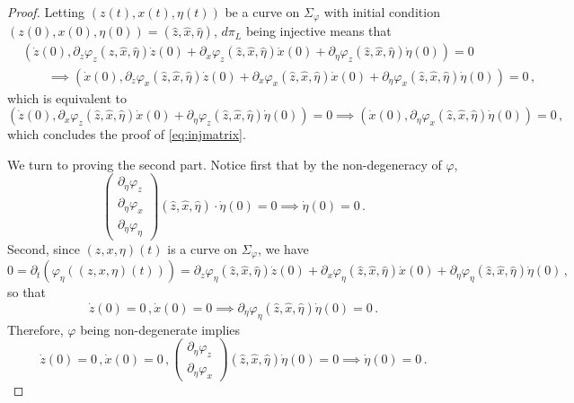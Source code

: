 \documentclass[10pt,a4paper]{amsart}
\newcommand{\del}{\partial}
\begin{document}
\begin{proof}
	Letting $(z(t), x(t),\eta(t))$ be a curve on $\Sigma_\varphi$ with initial condition $(z(0),x(0),\eta(0)) = (\hat z, \hat x, \hat \eta)$, $d\pi_L$ being injective means that
	\begin{align*}
		&{}(\dot z(0), \del_z\varphi_{z}(\hat z, \hat x, \hat \eta)\dot z(0)+ \del_x\varphi_{z}(\hat z, \hat x, \hat \eta)\dot x(0) +  \del_\eta\varphi_{z}(\hat z, \hat x, \hat \eta)\dot\eta(0)) = 0 \\
		&\qquad\implies (\dot x(0), \del_z\varphi_{x}(\hat z, \hat x, \hat \eta)\dot z(0)+ \del_x\varphi_{x}(\hat z, \hat x, \hat \eta)\dot x(0) +  \del_\eta\varphi_{x}(\hat z, \hat x, \hat \eta)\dot\eta(0)) = 0\,,
	\end{align*}
	which is equivalent to 
	\[
(\dot z(0), \del_x\varphi_{z}(\hat z, \hat x, \hat \eta)\dot x(0) +  \del_\eta\varphi_{z}(\hat z, \hat x, \hat \eta)\dot\eta(0)) = 0 \implies (\dot x(0), \del_\eta\varphi_{x}(\hat z, \hat x, \hat \eta)\dot\eta(0)) = 0\,,
	\]
	which concludes the proof of \cref{eq:injmatrix}.

	We turn to proving the second part. Notice first that by the non-degeneracy of $\varphi$,
	\[
		\begin{pmatrix}\del_\eta\varphi_z \\ \del_\eta\varphi_x \\ \del_\eta\varphi_\eta \end{pmatrix}(\hat z,\hat x,\hat\eta)\cdot \dot \eta(0) = 0 \implies \dot\eta(0)=0\,.
	\]
	Second, since $(z,x,\eta)(t)$ is a curve on $\Sigma_\varphi$, we have
	\[
		0 = \del_t(\varphi_\eta((z,x,\eta)(t))) = \del_z \varphi_\eta(\hat z,\hat x, \hat \eta) \dot z(0) + \del_x\varphi_\eta(\hat z,\hat x, \hat \eta)\dot x(0) + \del_\eta \varphi_\eta(\hat z,\hat x, \hat \eta) \dot \eta(0)\,,
	\]
	so that
	\[
		\dot z(0)=0\,,\dot x(0) = 0 \implies \del_\eta \varphi_\eta(\hat z, \hat x, \hat \eta) \dot \eta(0) = 0\,.
	\]
	Therefore, $\varphi$ being non-degenerate implies 
	\begin{equation}\label{eq:nondegenjustcheckxz}
		\dot z(0)=0\,, \dot x(0)=0\,, \begin{pmatrix}\del_\eta\varphi_z \\ \del_\eta\varphi_x\end{pmatrix}(\hat z,\hat x, \hat\eta)\dot \eta(0) = 0 \implies \dot\eta(0)=0\,.
	\end{equation}


\end{proof}
\end{document}
